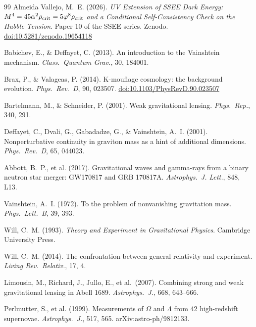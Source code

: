 \documentclass[12pt,a4paper]{article}
\begin{document}
\begin{thebibliography}{99}
  Almeida Vallejo, M.~E. (2026).
  \textit{UV Extension of SSEE Dark Energy: $M^4 = 45\alpha^2\rho_{\rm crit}
  = 5\varphi^8\rho_{\rm crit}$ and a Conditional Self-Consistency Check on the
  Hubble Tension}.
  Paper 10 of the SSEE series. Zenodo. \href{https://doi.org/10.5281/zenodo.19654118}{doi:10.5281/zenodo.19654118}

  Babichev, E., \& Deffayet, C. (2013).
  An introduction to the Vainshtein mechanism.
  \textit{Class.\ Quantum Grav.}, 30, 184001.

  Brax, P., \& Valageas, P. (2014).
  K-mouflage cosmology: the background evolution.
  \textit{Phys.\ Rev.\ D}, 90, 023507.
  \href{https://doi.org/10.1103/PhysRevD.90.023507}{doi:10.1103/PhysRevD.90.023507}

  Bartelmann, M., \& Schneider, P. (2001).
  Weak gravitational lensing.
  \textit{Phys.\ Rep.}, 340, 291.

  Deffayet, C., Dvali, G., Gabadadze, G., \& Vainshtein, A.~I. (2001).
  Nonperturbative continuity in graviton mass as a hint of additional
  dimensions.
  \textit{Phys.\ Rev.\ D}, 65, 044023.

  Abbott, B.~P., et al. (2017).
  Gravitational waves and gamma-rays from a binary neutron star merger:
  GW170817 and GRB 170817A.
  \textit{Astrophys.\ J. Lett.}, 848, L13.

  Vainshtein, A.~I. (1972).
  To the problem of nonvanishing gravitation mass.
  \textit{Phys.\ Lett.\ B}, 39, 393.

  Will, C.~M. (1993).
  \textit{Theory and Experiment in Gravitational Physics}.
  Cambridge University Press.

  Will, C.~M. (2014).
  The confrontation between general relativity and experiment.
  \textit{Living Rev.\ Relativ.}, 17, 4.

  Limousin, M., Richard, J., Jullo, E., et al.\ (2007).
  Combining strong and weak gravitational lensing in Abell 1689.
  \textit{Astrophys.\ J.}, 668, 643--666.

  Perlmutter, S., et al. (1999).
  Measurements of $\Omega$ and $\Lambda$ from 42 high-redshift supernovae.
  \textit{Astrophys.\ J.}, 517, 565.
  arXiv:astro-ph/9812133.


\end{thebibliography}
\end{document}
